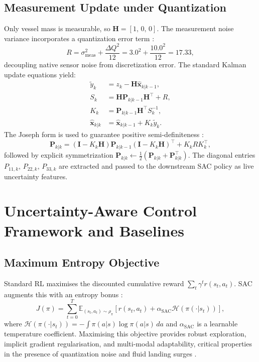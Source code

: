 \documentclass[conference]{IEEEtran}
\begin{document}
\subsection{Measurement Update under Quantization}

Only vessel mass is measurable, so $\mathbf{H} = 
[1,\,0,\,0]$. The measurement noise variance incorporates 
a quantization error term \cite{simon2006}:
\begin{equation}
    R = \sigma_\text{meas}^2 + \frac{\Delta Q^2}{12} 
    = 3.0^2 + \frac{10.0^2}{12} = 17.33,
\end{equation}
decoupling native sensor noise from discretization error. 
The standard Kalman update equations yield:
\begin{align}
    \tilde{y}_k &= z_k - \mathbf{H}\hat{\mathbf{x}}_{k|k-1}, \\
    S_k         &= \mathbf{H}\mathbf{P}_{k|k-1}
                    \mathbf{H}^\top + R, \\
    K_k         &= \mathbf{P}_{k|k-1}\mathbf{H}^\top 
                    S_k^{-1}, \\
    \hat{\mathbf{x}}_{k|k} &= \hat{\mathbf{x}}_{k|k-1} 
                    + K_k\tilde{y}_k.
\end{align}
The Joseph form is used to guarantee positive 
semi-definiteness \cite{simon2006}:
\begin{equation}
    \mathbf{P}_{k|k} = (\mathbf{I} - K_k\mathbf{H})
    \mathbf{P}_{k|k-1}(\mathbf{I} - K_k\mathbf{H})^\top 
    + K_k R K_k^\top,
\end{equation}
followed by explicit symmetrization 
$\mathbf{P}_{k|k} \leftarrow \tfrac{1}{2}
(\mathbf{P}_{k|k} + \mathbf{P}_{k|k}^\top)$. The 
diagonal entries $P_{11,k},\,P_{22,k},\,P_{33,k}$ are 
extracted and passed to the downstream SAC policy as 
live uncertainty features.

\section{Uncertainty-Aware Control Framework and Baselines}
\label{sec:sac}

\subsection{Maximum Entropy Objective}

Standard RL maximises the discounted cumulative reward $\sum_t \gamma^t r(s_t, a_t)$. SAC augments this with an entropy bonus \cite{haarnoja2018}:
\begin{equation}
    J(\pi) = \sum_{t=0}^{T} \mathbb{E}_{(s_t, a_t)\sim\rho_\pi}\!\left[r(s_t, a_t) + \alpha_\text{SAC}\mathcal{H}(\pi(\cdot|s_t))\right],
\end{equation}
where $\mathcal{H}(\pi(\cdot|s_t)) = -\int \pi(a|s)\log\pi(a|s)\,da$ and $\alpha_\text{SAC}$ is a learnable temperature coefficient. Maximising this objective provides robust exploration, implicit gradient regularisation, and multi-modal adaptability, critical properties in the presence of quantization noise and fluid landing surges \cite{haarnoja2018}.
\end{document}

